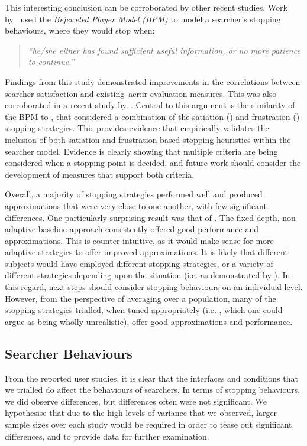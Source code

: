 This interesting conclusion can be corroborated by other recent studies. Work by~\cite{zhang2017bejewled} used the \emph{Bejeweled Player Model (BPM)} to model a searcher's stopping behaviours, where they would stop when:

\begin{quote}
    \emph{``he/she either has found sufficient useful information, or no more patience to continue.''}
\end{quote}

Findings from this study demonstrated improvements in the correlations between searcher satisfaction and existing~\gls{acr:ir} evaluation measures. This was also corroborated in a recent study by~\cite{azzopardi2018cwl}. Central to this argument is the similarity of the BPM to , that considered a combination of the satiation () and frustration () stopping strategies. This provides evidence that empirically validates the inclusion of both satiation and frustration-based stopping heuristics within the searcher model. Evidence is clearly showing that multiple criteria are being considered when a stopping point is decided, and future work should consider the development of measures that support both criteria.

Overall, a majority of stopping strategies performed well and produced approximations that were very close to one another, with few significant differences. One particularly surprising result was that of . The fixed-depth, non-adaptive baseline approach consistently offered good performance and approximations. This is counter-intuitive, as it would make sense for more adaptive strategies to offer improved approximations. It is likely that different subjects would have employed different stopping strategies, or a variety of different strategies depending upon the situation (i.e. as demonstrated by ). In this regard, next steps should consider stopping behaviours on an individual level. However, from the perspective of averaging over a population, many of the stopping strategies trialled, when tuned appropriately (i.e. , which one could argue as being wholly unrealistic), offer good approximations and performance.

\subsection{Searcher Behaviours}\label{sec:conclusions:discussion:behaviours}
From the reported user studies, it is clear that the interfaces and conditions that we trialled do affect the behaviours of searchers. In terms of stopping behaviours, we did observe differences, but differences often were not significant. We hypothesise that due to the high levels of variance that we observed, larger sample sizes over each study would be required in order to tease out significant differences, and to provide data for further examination.

